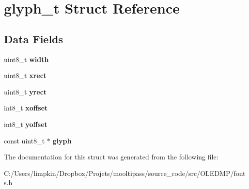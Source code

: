 \hypertarget{structglyph__t}{\section{glyph\+\_\+t Struct Reference}
\label{structglyph__t}
}
\subsection*{Data Fields}
\begin{DoxyCompactItemize}
\item 
\hypertarget{structglyph__t_a09a2a45f731b02946ff6d3cd15c1a476}{uint8\+\_\+t {\bfseries width}}\label{structglyph__t_a09a2a45f731b02946ff6d3cd15c1a476}

\item 
\hypertarget{structglyph__t_a46d1f5dd7c1a75b29bd8ff4572263129}{uint8\+\_\+t {\bfseries xrect}}\label{structglyph__t_a46d1f5dd7c1a75b29bd8ff4572263129}

\item 
\hypertarget{structglyph__t_a59c390ac18717a7ff28f85cc8a829a8e}{uint8\+\_\+t {\bfseries yrect}}\label{structglyph__t_a59c390ac18717a7ff28f85cc8a829a8e}

\item 
\hypertarget{structglyph__t_a248c78bc36899ea7581e379d926f480a}{int8\+\_\+t {\bfseries xoffset}}\label{structglyph__t_a248c78bc36899ea7581e379d926f480a}

\item 
\hypertarget{structglyph__t_a1f3726a53d108483e5f64b4cf1edda88}{int8\+\_\+t {\bfseries yoffset}}\label{structglyph__t_a1f3726a53d108483e5f64b4cf1edda88}

\item 
\hypertarget{structglyph__t_a2bad71d1abe181892d7ec3a7223b0035}{const uint8\+\_\+t $\ast$ {\bfseries glyph}}\label{structglyph__t_a2bad71d1abe181892d7ec3a7223b0035}

\end{DoxyCompactItemize}


The documentation for this struct was generated from the following file\+:\begin{DoxyCompactItemize}
\item 
C\+:/\+Users/limpkin/\+Dropbox/\+Projets/mooltipass/source\+\_\+code/src/\+O\+L\+E\+D\+M\+P/fonts.\+h\end{DoxyCompactItemize}
